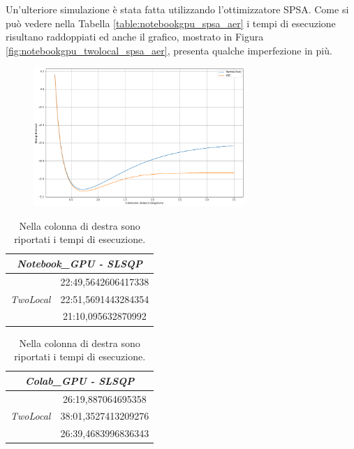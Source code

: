 Un'ulteriore simulazione è stata fatta utilizzando l'ottimizzatore SPSA.\newline
Come si può vedere nella Tabella \ref{table:notebookgpu_spsa_aer} i tempi di esecuzione risultano raddoppiati ed anche il grafico, mostrato in Figura \ref{fig:notebookgpu_twolocal_spsa_aer}, presenta qualche imperfezione in più.
\begin{figure}[htp]
    \centering
    \includegraphics[width=8cm]{Images/Capitolo3/Plots/H2_twolocal_ry_rz_cz_slsqp_aer_gpu_plot.png}
    \caption[Grafico 10 \newline TwoLocal - SLSQP - Notebook\_GPU e Colab\_GPU - Aer.]{}
    \label{fig:notebookgpu_twolocal_slsqp_aer}
\end{figure}
\begin{table}[h]
    \begin{subtable}[h]{0.45\textwidth}
        \centering
        \begin{tabular}[b]{l|c}
            \hline\hline
            \multicolumn{2}{c}{\textbf{\textit{Notebook\_GPU - SLSQP}}}\\
            \hline
            \multirow{3}{*}{\textit{TwoLocal}} & 22:49,5642606417338\\
            \cline{2-2} & 22:51,5691443284354\\
            \cline{2-2} & 21:10,095632870992\\
            \hline\hline
        \end{tabular}
        \caption{}
        \label{table:notebookgpu_slsqp_gpu}
    \end{subtable}
    \hfill
    \begin{subtable}[h]{0.45\textwidth}
        \centering
        \begin{tabular}[b]{l|c}
            \hline\hline
            \multicolumn{2}{c}{\textbf{\textit{Colab\_GPU - SLSQP}}}\\
            \hline
            \multirow{3}{*}{\textit{TwoLocal}} & 26:19,887064695358\\
            \cline{2-2} & 38:01,3527413209276\\
            \cline{2-2} & 26:39,4683996836343\\
            \hline\hline
        \end{tabular}
        \caption{}
        \label{table:colabgpu_slsqp_gpu}
     \end{subtable}
     \caption[Risultati simulazioni SLSQP.]{Nella colonna di destra sono riportati i tempi di esecuzione.}
\end{table}

